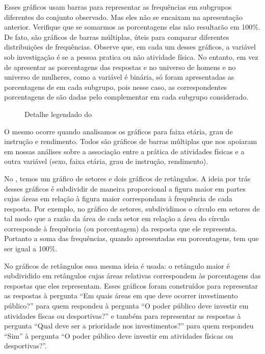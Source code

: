 Esses gráficos usam barras para representar as frequências em subgrupos diferentes do conjunto observado. Mas eles não se encaixam na apresentação anterior. Verifique que se somarmos as porcentagens elas não resultarão em 100\%. De fato, são gráficos de barras múltiplas, úteis para comparar diferentes distribuições de frequências. Observe que, em cada um desses gráficos, a variável sob investigação é se a pessoa pratica ou não atividade física. No entanto, em vez de apresentar as porcentagens das respostas  e  no universo de homens e no universo de mulheres, como a variável é binária, só foram apresentadas as porcentagens de  em cada subgrupo, pois nesse caso, as correspondentes porcentagens de  são dadas pelo complementar em cada subgrupo considerado.

\begin{figure}[H]
\centering
\capstart

\noindent{}
\caption{Detalhe legendado do }\label{\detokenize{PE103-1:fig-infografico-1-detalhe}}\label{\detokenize{PE103-1:id2}}\end{figure}

O mesmo ocorre quando analisamos os gráficos para faixa etária, grau de instrução e rendimento. Todos são gráficos de barras múltiplas que nos apoiaram em nossas análises sobre a associação entre a prática de atividades físicas e a outra variável (sexo, faixa etária, grau de instrução, rendimento).

No {\hyperref[\detokenize{PE103-0:fig-infografico-pnad-4}]{}}, temos um gráfico de setores e dois gráficos de retângulos. A ideia por trás desses gráficos é subdividir de maneira proporcional a figura maior em partes cujas áreas em relação à figura maior correspondam à frequência de cada resposta. Por exemplo, no gráfico de setores, subdividimos o círculo em setores de tal modo que a razão da área de cada setor em relação a área do círculo corresponde à frequência (ou porcentagem) da resposta que ele representa. Portanto a soma das frequências, quando apresentadas em porcentagens, tem que ser igual a 100$\%$.

No gráficos de retângulos essa mesma ideia é usada: o retângulo maior é subdividido em retângulos cujas áreas relativas correspondem às porcentagens das respostas que eles representam. Esses gráficos foram construídos para representar as respostas à pergunta ``Em quais áreas em que deve ocorrer investimento público?'' para quem respondeu  à pergunta ``O poder público deve investir em atividades físcas ou desportivas?'' e também para representar as respostas à pergunta ``Qual deve ser a prioridade nos investimentos?'' para quem respondeu ``Sim'' à pergunta ``O poder público deve investir em atividades físicas ou desportivas?''.

